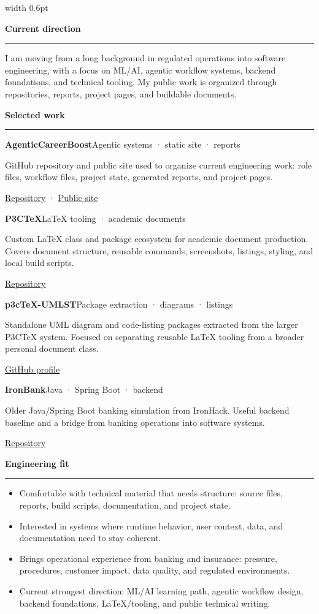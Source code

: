\documentclass[a4paper,10pt]{article}
\newcommand{\mainsection}[1]{%
	\vspace{0.36em}
	{\normalsize\bfseries\color{accent}#1}\par
	\vspace{0.07em}
	{\color{line}\hrule}
	\vspace{0.22em}
}
\newcommand{\project}[4]{%
	{\bfseries #1}\hfill{\scriptsize\textcolor{muted}{#2}}\par
	#3\par
	{\scriptsize #4}\par
	\vspace{0.20em}
}
\begin{document}
	\hfill
	{\color{line}\vrule width 0.6pt}
	\hfill
	\begin{minipage}[t]{0.675\textwidth}
		\small

		\mainsection{Current direction}

		I am moving from a long background in regulated operations into software engineering, with a focus on ML/AI, agentic workflow systems, backend foundations, and technical tooling. My public work is organized through repositories, reports, project pages, and buildable documents.

		\mainsection{Selected work}

		\project
		{AgenticCareerBoost}
		{Agentic systems · static site · reports}
		{GitHub repository and public site used to organize current engineering work: role files, workflow files, project state, generated reports, and project pages.}
		{\href{https://github.com/DidacLL/AgenticCareerBoost}{Repository} · \href{https://didacll.github.io/AgenticCareerBoost/}{Public site}}

		\project
		{P3CTeX}
		{LaTeX tooling · academic documents}
		{Custom LaTeX class and package ecosystem for academic document production. Covers document structure, reusable commands, screenshots, listings, styling, and local build scripts.}
		{\href{https://github.com/DidacLL/P3CTeX}{Repository}}

		\project
		{p3cTeX-UMLST}
		{Package extraction · diagrams · listings}
		{Standalone UML diagram and code-listing packages extracted from the larger P3CTeX system. Focused on separating reusable LaTeX tooling from a broader personal document class.}
		{\href{https://github.com/DidacLL}{GitHub profile}}

		\project
		{IronBank}
		{Java · Spring Boot · backend}
		{Older Java/Spring Boot banking simulation from IronHack. Useful backend baseline and a bridge from banking operations into software systems.}
		{\href{https://github.com/DidacLL/Ironhack-IronBank_FinalProject_vBNKsys}{Repository}}

		\mainsection{Engineering fit}

		\begin{itemize}
			\item Comfortable with technical material that needs structure: source files, reports, build scripts, documentation, and project state.
			\item Interested in systems where runtime behavior, user context, data, and documentation need to stay coherent.
			\item Brings operational experience from banking and insurance: pressure, procedures, customer impact, data quality, and regulated environments.
			\item Current strongest direction: ML/AI learning path, agentic workflow design, backend foundations, LaTeX/tooling, and public technical writing.
		\end{itemize}


\end{minipage}
\end{document}

